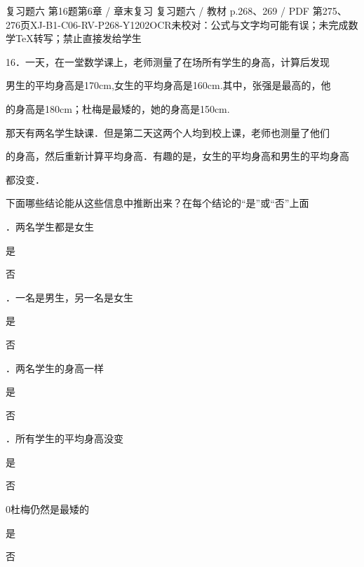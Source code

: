 \begin{bankitem}{复习题六 第16题}{第6章 / 章末复习 复习题六 / 教材 p.268、269 / PDF 第275、276页}{XJ-B1-C06-RV-P268-Y1202}{OCR未校对：公式与文字均可能有误；未完成数学TeX转写；禁止直接发给学生}
\begin{ocrdraft}
\par
16．一天，在一堂数学课上，老师测量了在场所有学生的身高，计算后发现
\par
男生的平均身高是170cm,女生的平均身高是160cm.其中，张强是最高的，他
\par
的身高是180cm；杜梅是最矮的，她的身高是150cm.
\par
那天有两名学生缺课．但是第二天这两个人均到校上课，老师也测量了他们
\par
的身高，然后重新计算平均身高．有趣的是，女生的平均身高和男生的平均身高
\par
都没变．
\par
下面哪些结论能从这些信息中推断出来？在每个结论的“是”或“否”上面
\par
．两名学生都是女生
\par
是
\par
否
\par
[教材p.269 / PDF第276页]
\par
．一名是男生，另一名是女生
\par
是
\par
否
\par
．两名学生的身高一样
\par
是
\par
否
\par
．所有学生的平均身高没变
\par
是
\par
否
\par
0杜梅仍然是最矮的
\par
是
\par
否
\end{ocrdraft}
\end{bankitem}
